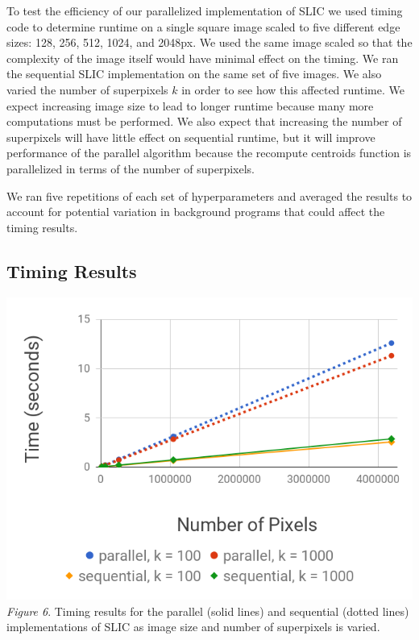 \documentclass[11pt,twocolumn]{article}
\begin{document}
To test the efficiency of our parallelized implementation of SLIC we used timing code to determine runtime on a single square image scaled to five different edge sizes: 128, 256, 512, 1024, and 2048px. We used the same image scaled so that the complexity of the image itself would have minimal effect on the timing. We ran the sequential SLIC implementation on the same set of five images. We also varied the number of superpixels $k$ in order to see how this affected runtime. We expect increasing image size to lead to longer runtime because many more computations must be performed. We also expect that increasing the number of superpixels will have little effect on sequential runtime, but it will improve performance of the parallel algorithm because the recompute centroids function is parallelized in terms of the number of superpixels. 

We ran five repetitions of each set of hyperparameters and averaged the results to account for potential variation in background programs that could affect the timing results.

\subsection{Timing Results}

\includegraphics[width = \linewidth]{timing_results.png} \\

\textit{Figure 6}. Timing results for the parallel (solid lines) and sequential (dotted lines) implementations of SLIC as image size and number of superpixels is varied. \\
\end{document}
